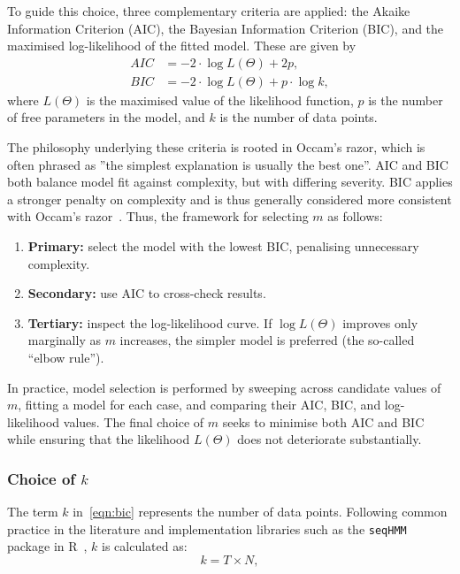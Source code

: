To guide this choice, three complementary criteria are applied: the Akaike Information Criterion (AIC), the Bayesian Information Criterion (BIC), and the maximised log-likelihood of the fitted model. These are given by
\begin{align}
    AIC &= -2 \cdot \log L(\Theta) + 2p, \label{eqn:aic}\\
    BIC &= -2 \cdot \log L(\Theta) + p \cdot \log k, \label{eqn:bic}
\end{align}
where $L(\Theta)$ is the maximised value of the likelihood function, $p$ is the number of free parameters in the model, and $k$ is the number of data points.  

The philosophy underlying these criteria is rooted in Occam’s razor, which is often phrased as ”the simplest
explanation is usually the best one”. AIC and BIC both balance model fit against complexity, but with differing severity. BIC applies a stronger penalty on complexity and is thus generally considered more consistent with Occam’s razor~\cite{Barber_2012}. Thus, the framework for selecting $m$ as follows:
\begin{enumerate}
    \item \textbf{Primary:} select the model with the lowest BIC, penalising unnecessary complexity.
    \item \textbf{Secondary:} use AIC to cross-check results.
    \item \textbf{Tertiary:} inspect the log-likelihood curve. If $\log L(\Theta)$ improves only marginally as $m$ increases, the simpler model is preferred (the so-called “elbow rule”).
\end{enumerate}

In practice, model selection is performed by sweeping across candidate values of $m$, fitting a model for each case, and comparing their AIC, BIC, and log-likelihood values. The final choice of $m$ seeks to minimise both AIC and BIC while ensuring that the likelihood $L(\Theta)$ does not deteriorate substantially.

\subsubsection{Choice of $k$}

The term $k$ in~\eqref{eqn:bic} represents the number of data points. Following common practice in the literature and implementation libraries such as the \texttt{seqHMM} package in R~\cite{cran_hmmSeq}, $k$ is calculated as: 
\[
    k = T \times N,
\]

